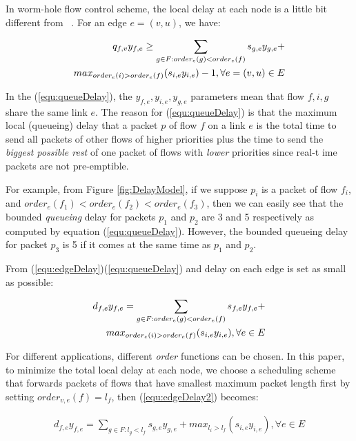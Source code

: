 \documentclass[conference, twocolumn]{IEEEtran}
\theoremstyle{definition}
\begin{document}
In worm-hole flow control scheme, the local delay at each node is a little bit
different from ~\cite{Ferrari90ascheme}. For an edge $e = (v,u)$, we have:

\begin{eqnarray}\label{equ:queueDelay}
q_{f,v}y_{f,e} \geq \sum_{g \in F:order_{e}(g) <
order_{e}(f)}s_{g,e}y_{g,e} + \notag \\ 
max_{order_{e}(i)>order_{e}(f)}(s_{i,e}y_{i,e})-1, \forall e = (v,u)
\in E
\end{eqnarray}

In the (\ref{equ:queueDelay}), the $y_{f,e}, y_{i,e}, y_{g,e}$ parameters mean
that flow $f, i, g$ share the same link $e$. The reason for
(\ref{equ:queueDelay}) is that the maximum local (queueing) delay  that a packet
$p$ of flow $f$ on a link $e$ is the total time to send all packets of other
flows of higher priorities plus  the time  to send the {\em biggest
possible rest} of one packet of flows with {\em lower} priorities since real-t
ime packets are not pre-emptible.

For example, from Figure \ref{fig:DelayModel}, if we suppose $p_i$ is a packet
of flow $f_i$, and $order_{e}(f_1) < order_{e}(f_2) < order_{e}(f_3)$, then we can easily see that
the bounded {\em queueing} delay for packets $p_1$ and $p_2$ are 3 and 5
respectively as computed by equation (\ref{equ:queueDelay}). However, the
bounded queueing delay for packet $p_3$ is 5 if it comes at the same time as $p_1$ and $p_2$.

From (\ref{equ:edgeDelay})(\ref{equ:queueDelay}) and delay on
each edge is set as small as possible:

\begin{eqnarray}\label{equ:edgeDelay2}
d_{f,e}y_{f,e} = \sum_{g \in F:order_e(g) < order_e(f)}s_{f,e}y_{f,e} +
\notag\\  
max_{order_{e}(i)>order_{e}(f)}(s_{i,e}y_{i,e}), \forall e \in E
\end{eqnarray}

For different applications, different {\em order} functions can be
chosen. In this paper, to minimize the total local delay at each node, we
choose a scheduling scheme that forwards packets of flows that have smallest maximum
packet length first by setting $order_{v,e}(f)=l_f$, then
(\ref{equ:edgeDelay2}) becomes:

\begin{eqnarray}\label{equ:edgeDelayPacketLength}
d_{f,e}y_{f,e} = \sum_{g \in F:l_g <
l_f}s_{g,e}y_{g,e} +max_{l_i>l_f}(s_{i,e}y_{i,e}), \forall e \in E
\end{eqnarray}
\end{document}
